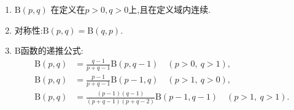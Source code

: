 \documentclass[../../main.tex]{subfiles}%
\begin{document}
\begin{theorem}\label{theorem:Beta函数的性质}
\begin{enumerate}[(1)]
\item  $\mathrm{B}(p,q)$ 在定义在$p>0,q>0$上,且在定义域内连续.

\item 对称性:$\mathrm{B}(p,q) = \mathrm{B}(q,p)$.

\item $\mathrm{B}$函数的递推公式:
\begin{align}
\mathrm{B}(p,q) &= \frac{q-1}{p+q-1}\mathrm{B}(p,q-1)\quad (p > 0,\ q > 1), \label{eq:B-recurrence-1} \\
\mathrm{B}(p,q) &= \frac{p-1}{p+q-1}\mathrm{B}(p-1,q)\quad (p > 1,\ q > 0), \label{eq:B-recurrence-2} \\
\mathrm{B}(p,q) &= \frac{(p-1)(q-1)}{(p+q-1)(p+q-2)}\mathrm{B}(p-1,q-1)\quad (p > 1,\ q > 1). \label{eq:B-recurrence-3}
\end{align}
\end{enumerate}
\end{theorem}
\end{document}
